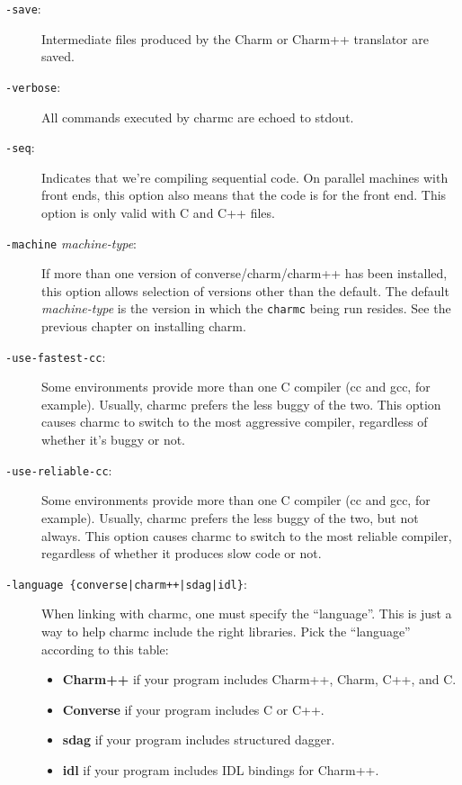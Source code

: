 \begin{description}
\item[{\tt -save}:]

Intermediate files produced by the Charm or Charm++ translator are saved.

\item[{\tt -verbose}:]

All commands executed by charmc are echoed to stdout.

\item[{\tt -seq}:]

Indicates that we're compiling sequential code.  On parallel machines
with front ends, this option also means that the code is for the front
end.  This option is only valid with C and C++ files.

\item[{\tt -machine} {\em machine-type}:]

If more than one version of converse/charm/charm++ has been installed,
this option allows selection of versions other than the default.  The
default {\em machine-type} is the version in which the {\tt charmc}
being run resides.  See the previous chapter on installing charm.

\item[{\tt -use-fastest-cc}:]

Some environments provide more than one C compiler (cc and gcc, for
example).  Usually, charmc prefers the less buggy of the two.  This
option causes charmc to switch to the most aggressive compiler,
regardless of whether it's buggy or not.

\item[{\tt -use-reliable-cc}:]

Some environments provide more than one C compiler (cc and gcc, for
example).  Usually, charmc prefers the less buggy of the two, but
not always.  This option causes charmc to switch to the most reliable
compiler, regardless of whether it produces slow code or not.

\item[{\tt -language \{converse|charm++|sdag|idl\}}:]

When linking with charmc, one must specify the ``language''.  This
is just a way to help charmc include the right libraries.  Pick the
``language'' according to this table:

\begin{itemize}
\item{{\bf Charm++} if your program includes Charm++, Charm, C++, and C.}
\item{{\bf Converse} if your program includes C or C++.}
\item{{\bf sdag} if your program includes structured dagger.}
\item{{\bf idl} if your program includes IDL bindings for Charm++.}
\end{itemize}


\end{description}
